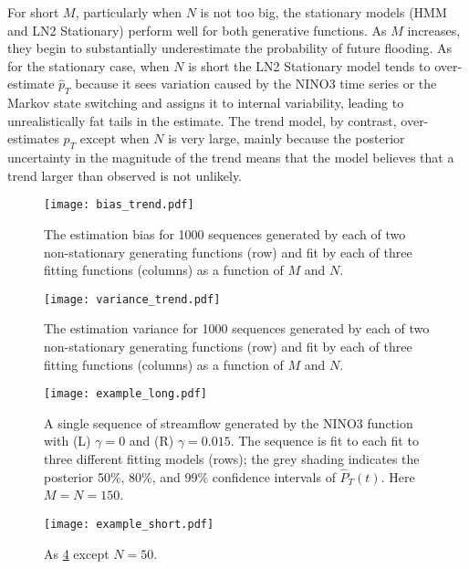 \documentclass[12pt]{article}
\begin{document}
For short $M$, particularly when $N$ is not too big, the stationary models (HMM and LN2 Stationary) perform well for both generative functions.
As $M$ increases, they begin to substantially underestimate the probability of future flooding.
As for the stationary case, when $N$ is short the LN2 Stationary model tends to over-estimate $\hat{p}_T$ because it sees variation caused by the NINO3 time series or the Markov state switching and assigns it to internal variability, leading to unrealistically fat tails in the estimate.
The trend model, by contrast, over-estimates $p_T$ except when $N$ is very large, mainly because the posterior uncertainty in the magnitude of the trend means that the model believes that a trend larger than observed is not unlikely.
\begin{figure}[ht]
  \texttt{[image: bias\_trend.pdf]}
  \caption{The estimation bias for 1000 sequences generated by each of two non-stationary generating functions (row) and fit by each of three fitting functions (columns) as a function of $M$ and $N$.\label{fig:trend-bias}}
\end{figure}

\begin{figure}[ht]
  \texttt{[image: variance\_trend.pdf]}
  \caption{The estimation variance for 1000 sequences generated by each of two non-stationary generating functions (row) and fit by each of three fitting functions (columns) as a function of $M$ and $N$.\label{fig:trend-variance}}
\end{figure}

\begin{figure}
  \texttt{[image: example\_long.pdf]}
  \caption{
    A single sequence of streamflow generated by the NINO3 function with (L) $\gamma=0$ and (R) $\gamma=0.015$. 
    The sequence is fit to each fit to three different fitting models (rows); the grey shading indicates the posterior 50\%, 80\%, and 99\% confidence intervals of $\hat{P}_T(t)$.
    Here $M=N=150$.\label{fig:example-long}
  }
\end{figure}

\begin{figure}
  \texttt{[image: example\_short.pdf]}
  \caption{
    As \cref{fig:example-short} except \(N=50\).\label{fig:example-short}
  }
\end{figure}

\end{document}
